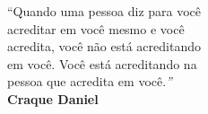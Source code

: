 \begin{epigrafe}
    \vspace*{\fill}
{%
	\noindent\hspace{.6\textwidth}
	{\begin{minipage}{.6\textwidth}
			``Quando uma pessoa diz para você\\acreditar em você mesmo e você\\acredita, você não está acreditando\\em você. Você está acreditando na\\pessoa que acredita em você.\textit{''} \\ \textbf{Craque Daniel}
	\end{minipage}}%
	\vspace*{2cm}
}%
\end{epigrafe}
